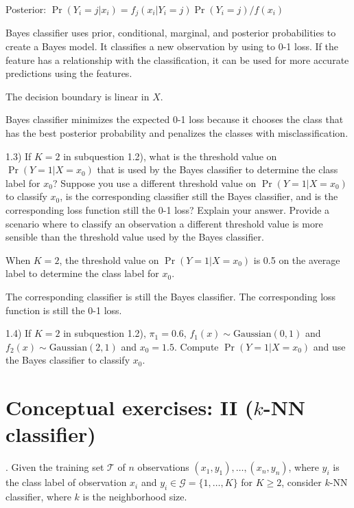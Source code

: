 \documentclass[
  11pt,
]{article}
\begin{document}
Posterior: \(\Pr(Y_i=j|x_i) = {f_j(x_i|Y_i=j)\Pr(Y_i=j)}/{f(x_i)}\)

Bayes classifier uses prior, conditional, marginal, and posterior
probabilities to create a Bayes model. It classifies a new observation
by using to 0-1 loss. If the feature has a relationship with the
classification, it can be used for more accurate predictions using the
features.

The decision boundary is linear in \(X\).

Bayes classifier minimizes the expected 0-1 loss because it chooses the
class that has the best posterior probability and penalizes the classes
with misclassification.

1.3) If \(K=2\) in subquestion 1.2), what is the threshold value on
\(\Pr(Y=1|X=x_0)\) that is used by the Bayes classifier to determine the
class label for \(x_0\)? Suppose you use a different threshold value on
\(\Pr(Y=1|X=x_0)\) to classify \(x_0\), is the corresponding classifier
still the Bayes classifier, and is the corresponding loss function still
the 0-1 loss? Explain your answer. Provide a scenario where to classify
an observation a different threshold value is more sensible than the
threshold value used by the Bayes classifier.

When \(K=2\), the threshold value on \(\Pr(Y=1|X=x_0)\) is 0.5 on the
average label to determine the class label for \(x_0\).

The corresponding classifier is still the Bayes classifier. The
corresponding loss function is still the 0-1 loss.

1.4) If \(K=2\) in subquestion 1.2), \(\pi_1=0.6\),
\(f_1(x) \sim \text{Gaussian}(0,1)\) and
\(f_2(x) \sim \text{Gaussian}(2,1)\) and \(x_0=1.5\). Compute
\(\Pr(Y=1|X=x_0)\) and use the Bayes classifier to classify \(x_0\).

\hypertarget{conceptual-exercises-ii-k-nn-classifier}{%
\section{\texorpdfstring{Conceptual exercises: II (\(k\)-NN
classifier)}{Conceptual exercises: II (k-NN classifier)}}\label{conceptual-exercises-ii-k-nn-classifier}}

. Given the training set \(\mathcal{T}\) of \(n\) observations
\((x_{1},y_{1}),\ldots,(x_{n},y_{n})\), where \(y_i\) is the class label
of observation \(x_i\) and \(y_i \in \mathcal{G}=\{1,\ldots,K\}\) for
\(K \ge 2\), consider \(k\)-NN classifier, where \(k\) is the
neighborhood size.
\end{document}
